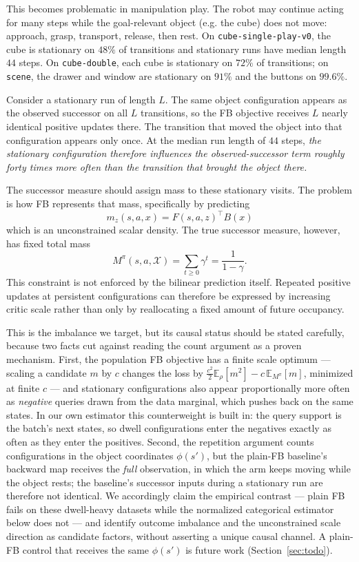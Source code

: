 \documentclass{article}
\newcommand{\E}{\mathbb{E}}
\begin{document}
This becomes problematic in manipulation play.
The robot may continue acting for many steps while the goal-relevant object (e.g. the cube) does not move: approach, grasp, transport, release, then rest.
On \texttt{cube-single-play-v0}, the cube is stationary on $48\%$ of transitions and stationary runs have median length $44$ steps.
On \texttt{cube-double}, each cube is stationary on $72\%$ of transitions; on \texttt{scene}, the drawer and window are stationary on $91\%$ and the buttons on $99.6\%$.

Consider a stationary run of length $L$.
The same object configuration appears as the observed successor on all $L$ transitions, so the FB objective receives $L$ nearly identical positive updates there.
The transition that moved the object into that configuration appears only once.
At the median run length of $44$ steps, \emph{the stationary configuration therefore influences the observed-successor term roughly forty times more often than the transition that brought the object there.}

The successor measure should assign mass to these stationary visits.
The problem is how FB represents that mass, specifically by predicting
\begin{equation}
    m_z(s,a,x)=F(s,a,z)^\top B(x)
\end{equation}
which is an unconstrained scalar density.
The true successor measure, however, has fixed total mass
\begin{equation}
M^\pi(s,a,\mathcal X) = \sum_{t\ge0}\gamma^t = \frac{1}{1-\gamma}.
\end{equation}
This constraint is not enforced by the bilinear prediction itself.
Repeated positive updates at persistent configurations can therefore be expressed by increasing critic scale rather than only by reallocating a fixed amount of future occupancy.

This is the imbalance we target, but its causal status should be stated carefully, because two facts cut against reading the count argument as a proven mechanism.
First, the population FB objective has a finite scale optimum --- scaling a candidate $m$ by $c$ changes the loss by $\tfrac{c^2}{2}\E_\rho[m^2] - c\,\E_{M^\pi}[m]$, minimized at finite $c$ --- and stationary configurations also appear proportionally more often as \emph{negative} queries drawn from the data marginal, which pushes back on the same states.
In our own estimator this counterweight is built in: the query support is the batch's next states, so dwell configurations enter the negatives exactly as often as they enter the positives.
Second, the repetition argument counts configurations in the object coordinates $\phi(s')$, but the plain-FB baseline's backward map receives the \emph{full} observation, in which the arm keeps moving while the object rests; the baseline's successor inputs during a stationary run are therefore not identical.
We accordingly claim the empirical contrast --- plain FB fails on these dwell-heavy datasets while the normalized categorical estimator below does not --- and identify outcome imbalance and the unconstrained scale direction as candidate factors, without asserting a unique causal channel.
A plain-FB control that receives the same $\phi(s')$ is future work (Section~\ref{sec:todo}).
\end{document}
